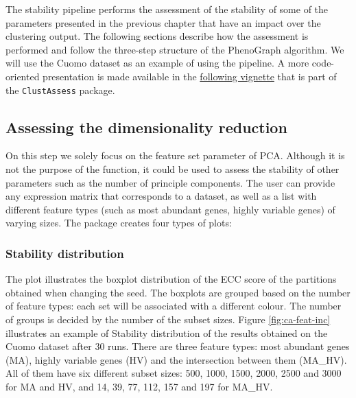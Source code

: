 The stability pipeline performs the assessment of the stability of some of the parameters presented in the previous chapter that have an impact over the clustering output. The following sections describe how the assessment is performed and follow the three-step structure of the PhenoGraph algorithm. We will use the Cuomo \cite{Cuomo2020} dataset as an example of using the pipeline. A more code-oriented presentation is made available in the \href{https://core-bioinformatics.github.io/ClustAssess/articles/stability-based-parameter-assessment.html}{following vignette} that is part of the \verb|ClustAssess| package.


\subsection{Assessing the dimensionality reduction}
On this step we solely focus on the feature set parameter of PCA. Although it is not the purpose of the function, it could be used to assess the stability of other parameters such as the number of principle components. The user can provide any expression matrix that corresponds to a dataset, as well as a list with different feature types (such as most abundant genes, highly variable genes) of varying sizes. The package creates four types of plots:

\subsubsection{Stability distribution}
The plot illustrates the boxplot distribution of the ECC score of the partitions obtained when changing the seed. The boxplots are grouped based on the number of feature types: each set will be associated with a different colour. The number of groups is decided by the number of the subset sizes. Figure \ref{fig:ca-feat-inc} illustrates an example of Stability distribution of the results obtained on the Cuomo dataset after 30 runs. There are three feature types: most abundant genes (MA), highly variable genes (HV) and the intersection between them (MA\_HV). All of them have six different subset sizes: 500, 1000, 1500, 2000, 2500 and 3000 for MA and HV, and 14, 39, 77, 112, 157 and 197 for MA\_HV. 

